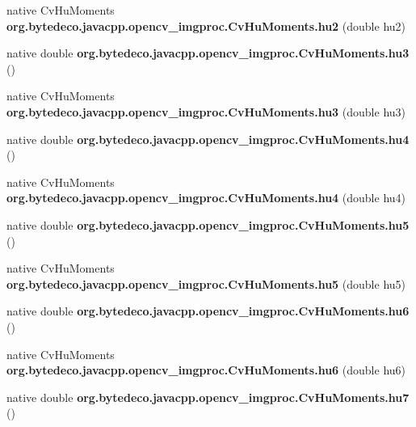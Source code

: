 \begin{DoxyCompactItemize}
native Cv\+Hu\+Moments {\bfseries org.\+bytedeco.\+javacpp.\+opencv\+\_\+imgproc.\+Cv\+Hu\+Moments.\+hu2} (double hu2)
\item 
\mbox{\label{group__imgproc_ga857b585d13fd101090e84a1f8e4fb98f}} 
native double {\bfseries org.\+bytedeco.\+javacpp.\+opencv\+\_\+imgproc.\+Cv\+Hu\+Moments.\+hu3} ()
\item 
\mbox{\label{group__imgproc_ga4f7244c2b6d0af1cac8b615cf87fe3ca}} 
native Cv\+Hu\+Moments {\bfseries org.\+bytedeco.\+javacpp.\+opencv\+\_\+imgproc.\+Cv\+Hu\+Moments.\+hu3} (double hu3)
\item 
\mbox{\label{group__imgproc_gaa6ac00fc84d9dfff8841eb13e9fdd904}} 
native double {\bfseries org.\+bytedeco.\+javacpp.\+opencv\+\_\+imgproc.\+Cv\+Hu\+Moments.\+hu4} ()
\item 
\mbox{\label{group__imgproc_gaabf6612da80cd6c1d245815c1c013164}} 
native Cv\+Hu\+Moments {\bfseries org.\+bytedeco.\+javacpp.\+opencv\+\_\+imgproc.\+Cv\+Hu\+Moments.\+hu4} (double hu4)
\item 
\mbox{\label{group__imgproc_ga4ea2a2bc4d7ce092da746300fb575212}} 
native double {\bfseries org.\+bytedeco.\+javacpp.\+opencv\+\_\+imgproc.\+Cv\+Hu\+Moments.\+hu5} ()
\item 
\mbox{\label{group__imgproc_ga39185aaa522e2d3c2fecd8c1ec593f49}} 
native Cv\+Hu\+Moments {\bfseries org.\+bytedeco.\+javacpp.\+opencv\+\_\+imgproc.\+Cv\+Hu\+Moments.\+hu5} (double hu5)
\item 
\mbox{\label{group__imgproc_ga798262fda0af854e3c42a243a0630330}} 
native double {\bfseries org.\+bytedeco.\+javacpp.\+opencv\+\_\+imgproc.\+Cv\+Hu\+Moments.\+hu6} ()
\item 
\mbox{\label{group__imgproc_ga83da536b461042ca41dd8c482aff7504}} 
native Cv\+Hu\+Moments {\bfseries org.\+bytedeco.\+javacpp.\+opencv\+\_\+imgproc.\+Cv\+Hu\+Moments.\+hu6} (double hu6)
\item 
\mbox{\label{group__imgproc_ga8eb4e570f1a231713c57c322e8bd7a21}} 
native double {\bfseries org.\+bytedeco.\+javacpp.\+opencv\+\_\+imgproc.\+Cv\+Hu\+Moments.\+hu7} ()

\end{DoxyCompactItemize}

